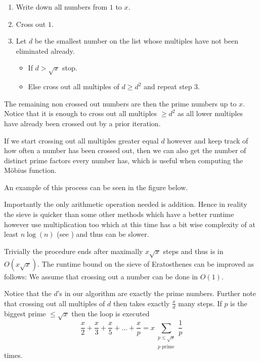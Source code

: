 \begin{enumerate}
	\item Write down all numbers from $1$ to $x$.
	\item Cross out $1$.
	\item Let $d$ be the smallest number on the list whose multiples have not been eliminated already.
		 \begin{itemize}
			\item If $d > \sqrt{x}$ stop.
			\item Else cross out all multiples of $d \geq d^2$ and repeat step 3.
		\end{itemize}
\end{enumerate}
The remaining non crossed out numbers are then the prime numbers up to  $x$.
Notice that it is enough to cross out all multiples $\geq d^2$ as all lower multiples have already been crossed out by
a prior iteration.

\begin{remark}
	If we start crossing out all multiples greater equal $d$ however and keep track of how often a number has been crossed out,
	then we can also get the number of distinct prime factors every number has, which is useful when 
	computing the Möbius function.
\end{remark}

 \begin{eg}
	An example of this process can be seen in the figure below.
\end{eg}

\begin{remark}
Importantly the only arithmetic operation needed is addition.
Hence in reality the sieve is quicker than some other methods which have a better
runtime however use multiplication too which at this time has a bit wise complexity of at least $n \log(n)$ (see \cite{harvey21}) and thus can be slower.
\end{remark}

Trivially the procedure ends after maximally $x \sqrt{x}$ steps and thus is in $O(x\sqrt{x})$.
The runtime bound on the sieve of Eratosthenes can be improved as follows:
We assume that crossing out a number can be done in $O(1)$.

Notice that the $d$'s in our algorithm are exactly the prime numbers. Further note 
that crossing out all multiples of $d$ then takes exactly $\frac{x}{d}$ many steps. If $p$ is 
the biggest prime $\leq \sqrt{x} $ then the loop is executed
\[
	\frac{x}{2} + \frac{x}{3} + \frac{x}{5} + \ldots + \frac{x}{p} = x \sum_{\substack{p \leq \sqrt{x}\\ p \text{ prime}}} \frac{1}{p}
\] 
times.

